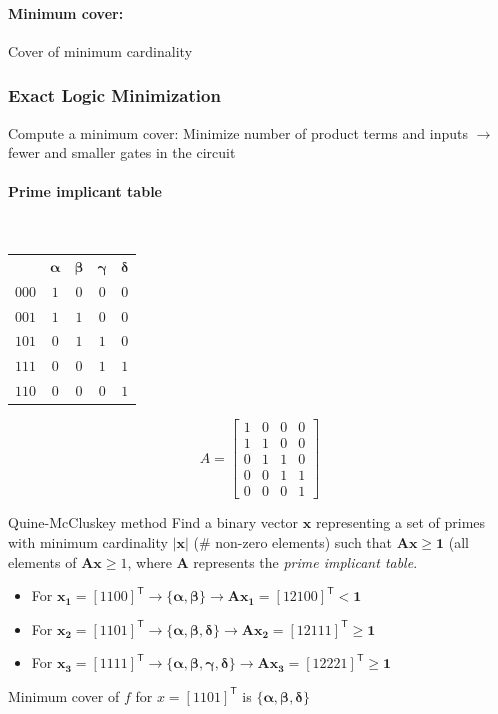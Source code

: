 \documentclass[a4paper]{article}
\begin{document}
\paragraph{Minimum cover:} Cover of minimum cardinality

\subsubsection{Exact Logic Minimization}

Compute a minimum cover: Minimize number of product terms and inputs $\rightarrow$ fewer and smaller gates in the circuit

\paragraph{Prime implicant table}
\
\begin{table}[h!]
    \centering
    \begin{tabular}{ccccc}
         & $\mathbf{\alpha}$ & $\mathbf{\beta}$ & $\mathbf{\gamma}$ & $\mathbf{\delta}$\\
        $000$ & $1$ & $0$ & $0$ & $0$\\
        $001$ & $1$ & $1$ & $0$ & $0$\\
        $101$ & $0$ & $1$ & $1$ & $0$\\
        $111$ & $0$ & $0$ & $1$ & $1$\\
        $110$ & $0$ & $0$ & $0$ & $1$\\
    \end{tabular}
\end{table}
$$A = \begin{bmatrix}
    1&0&0&0\\1&1&0&0\\0&1&1&0\\0&0&1&1\\0&0&0&1
\end{bmatrix}$$

\begin{mainbox}{Quine-McCluskey method}
    Find a binary vector $\mathbf{x}$ representing a set of primes with minimum cardinality $\lvert \mathbf{x} \rvert$ (\# non-zero elements) such that $\mathbf{Ax} \geq \mathbf{1}$ (all elements of $\mathbf{Ax} \geq 1$, where $\mathbf{A}$ represents the \emph{prime implicant table}.

    \begin{itemize}
        \item For $\mathbf{x_1} = [1100]^\mathsf{T} \rightarrow \{\mathbf{\alpha}, \mathbf{\beta}\} \rightarrow \mathbf{Ax_1} = [12100]^\mathsf{T} < \mathbf{1}$
        \item For $\mathbf{x_2} = [1101]^\mathsf{T} \rightarrow \{\mathbf{\alpha}, \mathbf{\beta}, \mathbf{\delta}\} \rightarrow \mathbf{Ax_2} = [12111]^\mathsf{T} \geq \mathbf{1}$
        \item For $\mathbf{x_3} = [1111]^\mathsf{T} \rightarrow \{\mathbf{\alpha}, \mathbf{\beta}, \mathbf{\gamma}, \mathbf{\delta}\} \rightarrow \mathbf{Ax_3} = [12221]^\mathsf{T} \geq \mathbf{1}$
    \end{itemize}
    Minimum cover of $f$ for $x = [1101]^\mathsf{T}$ is $\{\mathbf{\alpha}, \mathbf{\beta}, \mathbf{\delta}\}$
\end{mainbox}
\end{document}
